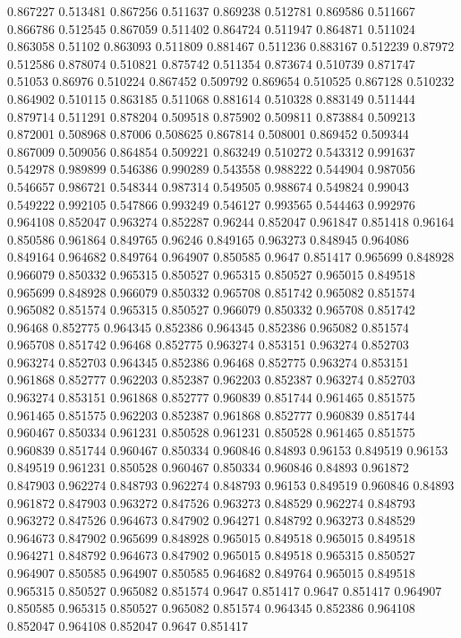 0.867227 0.513481
0.867256 0.511637
0.869238 0.512781
0.869586 0.511667
0.866786 0.512545
0.867059 0.511402
0.864724 0.511947
0.864871 0.511024
0.863058 0.51102
0.863093 0.511809
0.881467 0.511236
0.883167 0.512239
0.87972 0.512586
0.878074 0.510821
0.875742 0.511354
0.873674 0.510739
0.871747 0.51053
0.86976 0.510224
0.867452 0.509792
0.869654 0.510525
0.867128 0.510232
0.864902 0.510115
0.863185 0.511068
0.881614 0.510328
0.883149 0.511444
0.879714 0.511291
0.878204 0.509518
0.875902 0.509811
0.873884 0.509213
0.872001 0.508968
0.87006 0.508625
0.867814 0.508001
0.869452 0.509344
0.867009 0.509056
0.864854 0.509221
0.863249 0.510272
0.543312 0.991637
0.542978 0.989899
0.546386 0.990289
0.543558 0.988222
0.544904 0.987056
0.546657 0.986721
0.548344 0.987314
0.549505 0.988674
0.549824 0.99043
0.549222 0.992105
0.547866 0.993249
0.546127 0.993565
0.544463 0.992976
0.964108 0.852047
0.963274 0.852287
0.96244 0.852047
0.961847 0.851418
0.96164 0.850586
0.961864 0.849765
0.96246 0.849165
0.963273 0.848945
0.964086 0.849164
0.964682 0.849764
0.964907 0.850585
0.9647 0.851417
0.965699 0.848928
0.966079 0.850332
0.965315 0.850527
0.965315 0.850527
0.965015 0.849518
0.965699 0.848928
0.966079 0.850332
0.965708 0.851742
0.965082 0.851574
0.965082 0.851574
0.965315 0.850527
0.966079 0.850332
0.965708 0.851742
0.96468 0.852775
0.964345 0.852386
0.964345 0.852386
0.965082 0.851574
0.965708 0.851742
0.96468 0.852775
0.963274 0.853151
0.963274 0.852703
0.963274 0.852703
0.964345 0.852386
0.96468 0.852775
0.963274 0.853151
0.961868 0.852777
0.962203 0.852387
0.962203 0.852387
0.963274 0.852703
0.963274 0.853151
0.961868 0.852777
0.960839 0.851744
0.961465 0.851575
0.961465 0.851575
0.962203 0.852387
0.961868 0.852777
0.960839 0.851744
0.960467 0.850334
0.961231 0.850528
0.961231 0.850528
0.961465 0.851575
0.960839 0.851744
0.960467 0.850334
0.960846 0.84893
0.96153 0.849519
0.96153 0.849519
0.961231 0.850528
0.960467 0.850334
0.960846 0.84893
0.961872 0.847903
0.962274 0.848793
0.962274 0.848793
0.96153 0.849519
0.960846 0.84893
0.961872 0.847903
0.963272 0.847526
0.963273 0.848529
0.962274 0.848793
0.963272 0.847526
0.964673 0.847902
0.964271 0.848792
0.963273 0.848529
0.964673 0.847902
0.965699 0.848928
0.965015 0.849518
0.965015 0.849518
0.964271 0.848792
0.964673 0.847902
0.965015 0.849518
0.965315 0.850527
0.964907 0.850585
0.964907 0.850585
0.964682 0.849764
0.965015 0.849518
0.965315 0.850527
0.965082 0.851574
0.9647 0.851417
0.9647 0.851417
0.964907 0.850585
0.965315 0.850527
0.965082 0.851574
0.964345 0.852386
0.964108 0.852047
0.964108 0.852047
0.9647 0.851417
